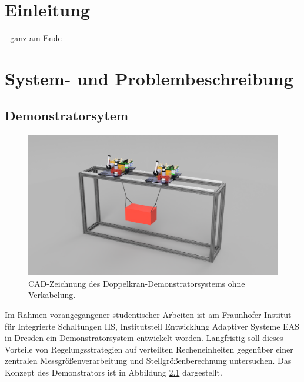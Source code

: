 \pagestyle{scrheadings}

\chapter{Einleitung}
- ganz am Ende

\chapter{System- und Problembeschreibung}

\section{Demonstratorsytem}

\begin{figure}[ht]
	\begin{center}
		\includegraphics[scale=0.5]{Pictures/Veritas_demo_CAD.png}
	\end{center}
	\caption[CAD-Zeichnung des Doppelkransystems]
	{CAD-Zeichnung des Doppelkran-Demonstratorsystems ohne Verkabelung.}
	\label{fig:demonstrator_CAD}
\end{figure}

Im Rahmen vorangegangener studentischer Arbeiten ist am Fraunhofer-Institut für Integrierte Schaltungen IIS, Institutsteil Entwicklung Adaptiver Systeme EAS \cite{fraunhoferIISEAS} in Dresden ein Demonstratorsystem entwickelt worden. Langfristig soll dieses Vorteile von Regelungsstrategien auf verteilten Recheneinheiten gegenüber einer zentralen Messgrößenverarbeitung und Stellgrößenberechnung untersuchen. Das Konzept des Demonstrators ist in Abbildung \ref{fig:demonstrator_CAD} dargestellt.

